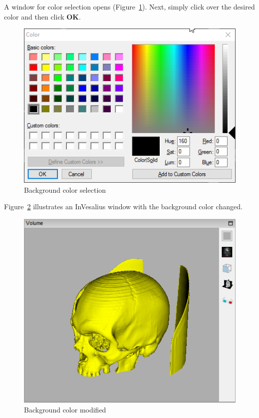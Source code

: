A window for color selection opens (Figure~\ref{fig:color_window_background}). Next, simply click over the desired color and then click \textbf{OK}.

\begin{figure}[!htb]
\centering
\includegraphics[scale=0.6]{../user_guide_figures/invesalius_screen/surface_select_color_windows_so_en.png}
\caption{Background color selection}
\label{fig:color_window_background}
\end{figure}

Figure~\ref{fig:background_color} illustrates an InVesalius window with the background color changed.

\begin{figure}[!htb]
\centering
\includegraphics[scale=0.7]{../user_guide_figures/invesalius_screen/3d_background_changed.png}
\caption{Background color modified}
\label{fig:background_color}
\end{figure}

